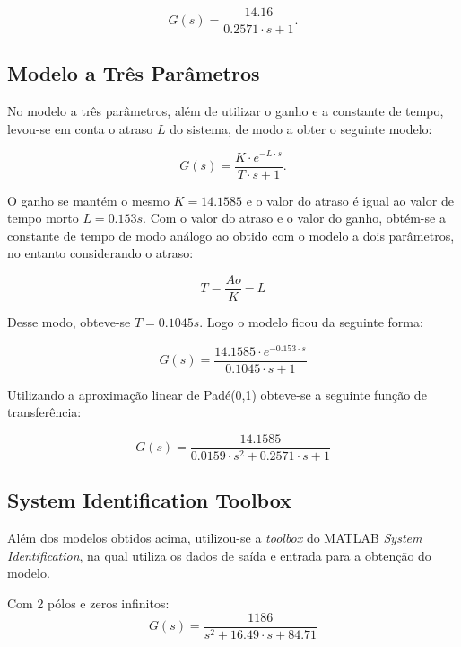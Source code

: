 \documentclass{article}
\begin{document}
\begin{equation}
    G(s) = \frac{14.16}{0.2571 \cdot s + 1}.
\end{equation}


\subsection{Modelo a Três Parâmetros}
No modelo a três parâmetros, além de utilizar o ganho e a constante de tempo, levou-se em conta o atraso $L$ do sistema, de modo a obter o seguinte modelo:

\begin{equation}
    G(s) = \frac{K \cdot e^{-L \cdot s\!}}{T \cdot s + 1}.
\end{equation}

O ganho se mantém o mesmo $K = 14.1585$ e o valor do atraso é igual ao valor de tempo morto $L = 0.153 s$. Com o valor do atraso e o valor do ganho, obtém-se a constante de tempo de modo análogo ao obtido com o modelo a dois parâmetros, no entanto considerando o atraso:

\begin{equation}
    T = \frac{Ao}{K} - {L}
\end{equation}

Desse modo, obteve-se $T = 0.1045 s$. Logo o modelo ficou da seguinte forma:

\begin{equation}
    G(s) = \frac{14.1585 \cdot e^{-0.153 \cdot s\!}}{0.1045 \cdot s + 1}
\end{equation}

Utilizando a aproximação linear de Padé(0,1) obteve-se a seguinte função de transferência:

\begin{equation}
    G(s) = \frac{14.1585}{0.0159 \cdot s^{2\!} + 0.2571 \cdot s + 1}
\end{equation}


\subsection{System Identification Toolbox}
Além dos modelos obtidos acima, utilizou-se a \textit{toolbox} do MATLAB \textit{System Identification}, na qual utiliza os dados de saída e entrada para a obtenção do modelo.

Com 2 pólos e zeros infinitos:
\begin{equation}
    G(s) = \frac{1186}{s^{2\!} + 16.49 \cdot s + 84.71}
\end{equation}
\end{document}

